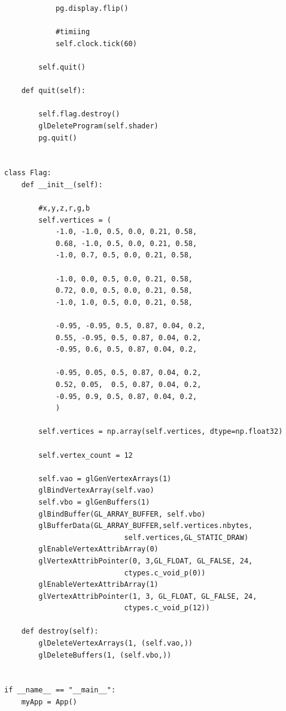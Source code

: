 \documentclass[12pt]{article}
\begin{document}
\begin{verbatim}
            pg.display.flip()

            #timiing
            self.clock.tick(60)

        self.quit()

    def quit(self):

        self.flag.destroy()
        glDeleteProgram(self.shader)
        pg.quit()


class Flag:
    def __init__(self):

        #x,y,z,r,g,b
        self.vertices = (
            -1.0, -1.0, 0.5, 0.0, 0.21, 0.58,
		    0.68, -1.0, 0.5, 0.0, 0.21, 0.58,
		    -1.0, 0.7, 0.5, 0.0, 0.21, 0.58,
								
		    -1.0, 0.0, 0.5, 0.0, 0.21, 0.58,
		    0.72, 0.0, 0.5, 0.0, 0.21, 0.58, 
		    -1.0, 1.0, 0.5, 0.0, 0.21, 0.58,

		    -0.95, -0.95, 0.5, 0.87, 0.04, 0.2,
		    0.55, -0.95, 0.5, 0.87, 0.04, 0.2,
		    -0.95, 0.6, 0.5, 0.87, 0.04, 0.2,
							
		    -0.95, 0.05, 0.5, 0.87, 0.04, 0.2,
		    0.52, 0.05,  0.5, 0.87, 0.04, 0.2, 
		    -0.95, 0.9, 0.5, 0.87, 0.04, 0.2,
            )

        self.vertices = np.array(self.vertices, dtype=np.float32)

        self.vertex_count = 12

        self.vao = glGenVertexArrays(1)
        glBindVertexArray(self.vao)
        self.vbo = glGenBuffers(1)
        glBindBuffer(GL_ARRAY_BUFFER, self.vbo)
        glBufferData(GL_ARRAY_BUFFER,self.vertices.nbytes,
                            self.vertices,GL_STATIC_DRAW)
        glEnableVertexAttribArray(0)
        glVertexAttribPointer(0, 3,GL_FLOAT, GL_FALSE, 24,
                            ctypes.c_void_p(0))
        glEnableVertexAttribArray(1)
        glVertexAttribPointer(1, 3, GL_FLOAT, GL_FALSE, 24, 
                            ctypes.c_void_p(12))

    def destroy(self):
        glDeleteVertexArrays(1, (self.vao,))
        glDeleteBuffers(1, (self.vbo,))


if __name__ == "__main__":
    myApp = App()

\end{verbatim}
\end{document}
